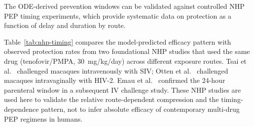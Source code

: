 \documentclass[12pt,a4paper]{article}
\theoremstyle{plain}
\theoremstyle{definition}
\theoremstyle{remark}
\begin{document}
The ODE-derived prevention windows can be validated against controlled NHP PEP timing experiments, which provide systematic data on protection as a function of delay and duration by route.
\begin{sloppypar}
Table~\ref{tab:nhp-timing} compares the model-predicted efficacy pattern with observed protection rates from two foundational NHP studies that used the same drug (tenofovir/PMPA, 30~mg/kg/day) across different exposure routes. Tsai et al.\ \citep{ref:Tsai1998} challenged macaques intravenously with SIV; Otten et al.\ \citep{ref:Otten2000} challenged macaques intravaginally with HIV-2. Emau et al.\ \citep{ref:Emau2006} confirmed the 24-hour parenteral window in a subsequent IV challenge study. These NHP studies are used here to validate the relative route-dependent compression and the timing-dependence pattern, not to infer absolute efficacy of contemporary multi-drug PEP regimens in humans.
\end{sloppypar}


\begin{table}[htbp]
\centering
\caption{NHP PEP timing data by route and treatment delay. All treatment groups received tenofovir (PMPA) 30~mg/kg/day for 28 days unless noted. Sample sizes: $n = 2$--$4$ per group.}\label{tab:nhp-timing}
\centering
\small
\setlength{\tabcolsep}{4pt}
\end{table}
\end{document}
